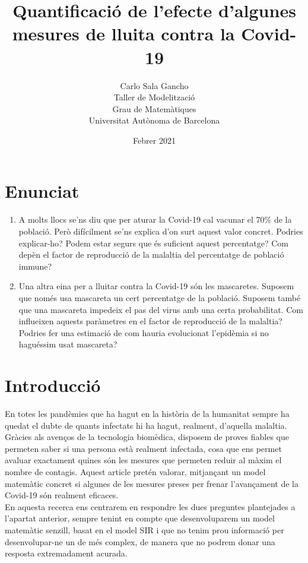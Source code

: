 \documentclass[a4paper, 11pt]{article}
\title{Quantificació de l'efecte d'algunes mesures de lluita contra la Covid-19}
\author{
  Carlo Sala Gancho\\
  Taller de Modelització\\
  Grau de Matemàtiques\\
  Universitat Autònoma de Barcelona
}
\date{Febrer 2021}
\begin{document}
\maketitle
\section*{Enunciat}
  \begin{enumerate}
    \item A molts llocs se'ns diu que per aturar la Covid-19 cal vacunar el 70\% de la població. Però difícilment se'ns explica d'on surt aquest valor concret. Podries explicar-ho? Podem estar segurs que és suficient aquest percentatge? Com depèn el factor de reproducció de la malaltia del percentatge de població immune?
    \item Una altra eina per a lluitar contra la Covid-19 són les mascaretes. Suposem que només usa mascareta un cert percentatge de la població. Suposem també que una mascareta impedeix el pas del virus amb una certa probabilitat. Com influeixen aquests paràmetres en el factor de reproducció de la malaltia? Podries fer una estimació de com hauria evolucionat l'epidèmia si no haguéssim usat mascareta?
  \end{enumerate}
\section{Introducció}
En totes les pandèmies que ha hagut en la història de la humanitat sempre ha quedat el dubte de quants infectats hi ha hagut, realment, d'aquella malaltia. Gràcies als avenços de la tecnologia biomèdica, disposem de proves fiables que permeten saber si una persona està realment infectada, cosa que ens permet avaluar exactament quines són les mesures que permeten reduir al màxim el nombre de contagis. Aquest article pretén valorar, mitjançant un model matemàtic concret si algunes de les mesures preses per frenar l'avançament de la Covid-19 són realment eficaces.\\
  En aquesta recerca ens centrarem en respondre les dues preguntes plantejades a l'apartat anterior, sempre tenint en compte que desenvoluparem un model matemàtic senzill, basat en el model SIR\cite{sir} i que no tenim prou informació per desenvolupar-ne un de més complex, de manera que no podrem donar una resposta extremadament acurada.
\end{document}
